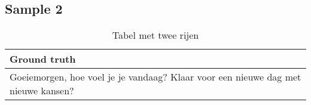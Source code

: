 \subsection{Sample 2}

\begin{table}[htbp]
    \centering
    \label{tab:groundtruth_sample2}
    \begin{tabularx}{\textwidth}{|X|}
        \hline
        \textbf{Ground truth} \\
        
        \hline
        Goeiemorgen, hoe voel je je vandaag? Klaar voor een nieuwe dag met nieuwe kansen? \\
        \hline
    \end{tabularx}
    \caption{Tabel met twee rijen}
\end{table}

